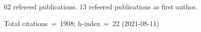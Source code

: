 62 refereed publications. 13 refeered publications as first author.

Total citations~=~1908; h-index~=~22 (2021-08-11)